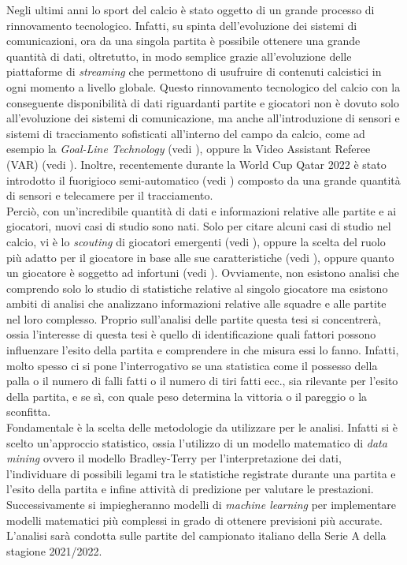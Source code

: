 Negli ultimi anni lo sport del calcio è stato oggetto di un grande processo di rinnovamento tecnologico. Infatti, su spinta dell'evoluzione dei sistemi di comunicazioni, ora da una singola partita è possibile ottenere una grande quantità di dati, oltretutto, in modo semplice grazie all'evoluzione delle piattaforme di \emph{streaming} che permettono di usufruire di contenuti calcistici in ogni momento a livello globale. Questo rinnovamento tecnologico del calcio con la conseguente disponibilità di dati riguardanti partite e giocatori non è dovuto solo all'evoluzione dei sistemi di comunicazione, ma anche all'introduzione di sensori e sistemi di tracciamento sofisticati all'interno del campo da calcio, come ad esempio la \emph{Goal-Line Technology} (vedi \textit{\cite{glt}}), oppure la Video Assistant Referee (VAR) (vedi \textit{\cite{var}}). Inoltre, recentemente durante la World Cup Qatar 2022 è stato introdotto il fuorigioco semi-automatico (vedi \textit{\cite{offside}}) composto da una grande quantità di sensori e telecamere per il tracciamento.\\
Perciò, con un'incredibile quantità di dati e informazioni relative alle partite e ai giocatori, nuovi casi di studio sono nati. Solo per citare alcuni casi di studio nel calcio, vi è lo \textit{scouting} di giocatori emergenti (vedi \autocite{vilela2018towards}), oppure la scelta del ruolo più adatto per il giocatore in base alle sue caratteristiche (vedi \autocite{razali2017predicting}), oppure quanto un giocatore è soggetto ad infortuni (vedi \autocite{theron2020use}). Ovviamente, non esistono analisi che comprendo solo lo studio di statistiche relative al singolo giocatore ma esistono ambiti di analisi che analizzano informazioni relative alle squadre e alle partite nel loro complesso. Proprio sull'analisi delle partite questa tesi si concentrerà, ossia l'interesse di questa tesi è quello di identificazione quali fattori possono influenzare l'esito della partita e comprendere in che misura essi lo fanno. Infatti, molto spesso ci si pone l'interrogativo se una statistica come il possesso della palla o il numero di falli fatti o il numero di tiri fatti ecc., sia rilevante per l'esito della partita, e se sì, con quale peso determina la vittoria o il pareggio o la sconfitta.\\
Fondamentale è la scelta delle metodologie da utilizzare per le analisi. Infatti si è scelto un'approccio statistico, ossia l'utilizzo di un modello matematico di \emph{data mining} ovvero il modello Bradley-Terry \autocite{bradley1952rank} per l'interpretazione dei dati, l'individuare di possibili legami tra le statistiche registrate durante una partita e l'esito della partita e infine attività di predizione per valutare le prestazioni. Successivamente si impiegheranno modelli di \emph{machine learning} per implementare modelli matematici più complessi in grado di ottenere previsioni più accurate. L'analisi sarà condotta sulle partite del campionato italiano della Serie A della stagione 2021/2022.
